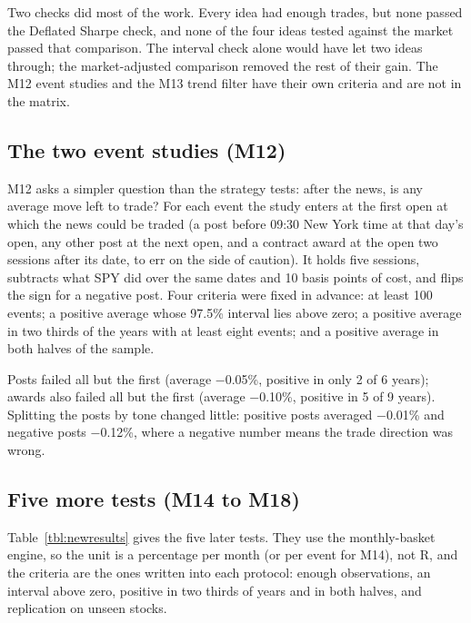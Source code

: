 \documentclass[11pt,a4paper]{article}
\begin{document}
Two checks did most of the work. Every idea had enough trades, but none passed the Deflated Sharpe check, and none of the
four ideas tested against the market passed that comparison. The interval check alone would have let two ideas through; the
market-adjusted comparison removed the rest of their gain. The M12 event studies and the M13 trend filter have their own
criteria and are not in the matrix.

\subsection{The two event studies (M12)}\label{the-two-event-studies-m12}

M12 asks a simpler question than the strategy tests: after the news, is any average move left to trade? For each event the
study enters at the first open at which the news could be traded (a post before 09:30 New York time at that day's open, any
other post at the next open, and a contract award at the open two sessions after its date, to err on the side of caution). It
holds five sessions, subtracts what SPY did over the same dates and 10 basis points of cost, and flips the sign for a negative
post. Four criteria were fixed in advance: at least 100 events; a positive average whose 97.5\% interval lies above zero; a
positive average in two thirds of the years with at least eight events; and a positive average in both halves of the sample.

Posts failed all but the first (average −0.05\%, positive in only 2 of 6 years); awards also failed all but the first (average
−0.10\%, positive in 5 of 9 years). Splitting the posts by tone changed little: positive posts averaged −0.01\% and negative
posts −0.12\%, where a negative number means the trade direction was wrong.

\subsection{Five more tests (M14 to M18)}\label{sec:newresults}

Table~\ref{tbl:newresults} gives the five later tests. They use the monthly-basket engine, so the unit is a percentage per month
(or per event for M14), not R, and the criteria are the ones written into each protocol: enough observations, an interval above zero,
positive in two thirds of years and in both halves, and replication on unseen stocks.
\end{document}
